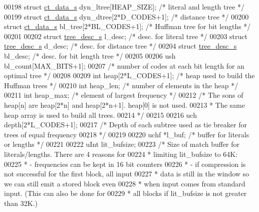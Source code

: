 \begin{DoxyCode}
00198     \textcolor{keyword}{struct }\hyperlink{structct__data__s}{ct\_data\_s} dyn\_ltree[HEAP\_SIZE];   \textcolor{comment}{/* literal and length tree */}
00199     \textcolor{keyword}{struct }\hyperlink{structct__data__s}{ct\_data\_s} dyn\_dtree[2*D\_CODES+1]; \textcolor{comment}{/* distance tree */}
00200     \textcolor{keyword}{struct }\hyperlink{structct__data__s}{ct\_data\_s} bl\_tree[2*BL\_CODES+1];  \textcolor{comment}{/* Huffman tree for bit lengths */}
00201 
00202     \textcolor{keyword}{struct }\hyperlink{structtree__desc__s}{tree\_desc\_s} l\_desc;               \textcolor{comment}{/* desc. for literal tree */}
00203     \textcolor{keyword}{struct }\hyperlink{structtree__desc__s}{tree\_desc\_s} d\_desc;               \textcolor{comment}{/* desc. for distance tree */}
00204     \textcolor{keyword}{struct }\hyperlink{structtree__desc__s}{tree\_desc\_s} bl\_desc;              \textcolor{comment}{/* desc. for bit length tree */}
00205 
00206     ush bl\_count[MAX\_BITS+1];
00207     \textcolor{comment}{/* number of codes at each bit length for an optimal tree */}
00208 
00209     \textcolor{keywordtype}{int} heap[2*L\_CODES+1];      \textcolor{comment}{/* heap used to build the Huffman trees */}
00210     \textcolor{keywordtype}{int} heap\_len;               \textcolor{comment}{/* number of elements in the heap */}
00211     \textcolor{keywordtype}{int} heap\_max;               \textcolor{comment}{/* element of largest frequency */}
00212     \textcolor{comment}{/* The sons of heap[n] are heap[2*n] and heap[2*n+1]. heap[0] is not used.}
00213 \textcolor{comment}{     * The same heap array is used to build all trees.}
00214 \textcolor{comment}{     */}
00215 
00216     uch depth[2*L\_CODES+1];
00217     \textcolor{comment}{/* Depth of each subtree used as tie breaker for trees of equal frequency}
00218 \textcolor{comment}{     */}
00219 
00220     uchf *l\_buf;          \textcolor{comment}{/* buffer for literals or lengths */}
00221 
00222     uInt  lit\_bufsize;
00223     \textcolor{comment}{/* Size of match buffer for literals/lengths.  There are 4 reasons for}
00224 \textcolor{comment}{     * limiting lit\_bufsize to 64K:}
00225 \textcolor{comment}{     *   - frequencies can be kept in 16 bit counters}
00226 \textcolor{comment}{     *   - if compression is not successful for the first block, all input}
00227 \textcolor{comment}{     *     data is still in the window so we can still emit a stored block even}
00228 \textcolor{comment}{     *     when input comes from standard input.  (This can also be done for}
00229 \textcolor{comment}{     *     all blocks if lit\_bufsize is not greater than 32K.)}

\end{DoxyCode}
